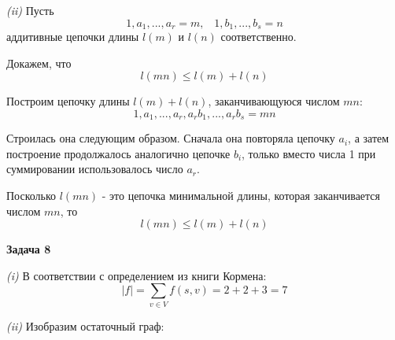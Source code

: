 \documentclass[10pt]{article}
\begin{document}
\smallskip

{\it (ii)}
Пусть
$$
  1, a_1, ..., a_r = m, \;\;\; 1, b_1, ..., b_s = n
$$
аддитивные цепочки длины $l(m)$ и $l(n)$ соответственно.

Докажем, что
$$
  l(m n) \leq l(m) + l(n)
$$

Построим цепочку длины $l(m) + l(n)$, заканчивающуюся числом $m n$:
$$
  1, a_1, ..., a_r, a_r b_1, ..., a_r b_s = m n
$$

Строилась она следующим образом. Сначала она повторяла цепочку $a_i$, а затем построение продолжалось аналогично цепочке $b_i$, только вместо числа 1 при суммировании использовалось число $a_r$.

Посколько $l(m n)$ - это цепочка минимальной длины, которая заканчивается числом $m n$, то
$$
  l(m n) \leq l(m) + l(n)
$$

\medskip

{\bf Задача 8}

{\it (i)}
В соответствии с определением из книги Кормена:
$$
  |f| = \sum\limits_{v \in V} f(s, v) = 2 + 2 + 3 = 7
$$

{\it (ii)} Изобразим остаточный граф:
\end{document}
